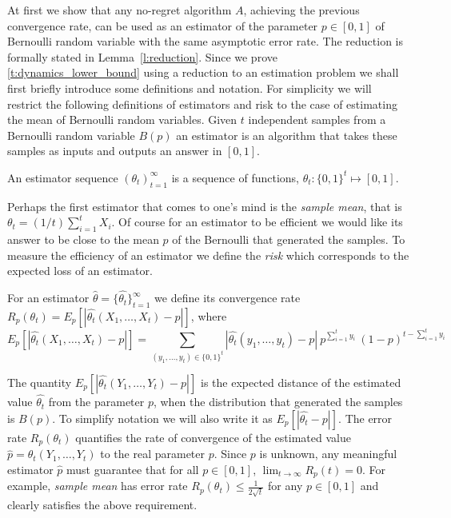 At first we show that any no-regret algorithm $A$, achieving the previous
convergence rate, can be used as an estimator of the parameter
$p \in [0,1] $ of Bernoulli random variable with the same asymptotic error
rate. The reduction is formally stated in Lemma~\ref{l:reduction}.
Since we prove \ref{t:dynamics_lower_bound} using a reduction to
an estimation problem we shall first briefly introduce some definitions and
notation. For simplicity we will restrict the following definitions
of estimators and risk to the case of estimating the mean of Bernoulli
random variables.
Given $t$ independent samples from a Bernoulli random variable $B(p)$
an estimator is an algorithm that takes these samples as inputs and
outputs an answer in $[0,1]$.
\begin{definition}\label{d:estimator}
  An estimator sequence $(\theta_t)_{t=1}^{\infty}$
  is a sequence of functions, $\theta_t: \{0,1\}^t\mapsto [0,1]$.
\end{definition}
Perhaps the first estimator that comes to one's mind is the
\emph{sample mean}, that is $\theta_t=(1/t) \sum_{i=1}^t X_i$.
Of course for an estimator to be efficient we would like its answer to be
close to the mean $p$ of the Bernoulli that generated the samples.
To measure the efficiency of an estimator we define the \emph{risk}
which corresponds to the expected loss of an estimator.
\begin{definition}\label{d:risk}
  For an estimator $\hat{\theta} =\{\hat{\theta_t}\}_{t=1}^\infty$ we define
  its convergence rate
  $R_p(\theta_t) = E_p[|\hat{\theta_t}(X_1,\ldots,X_t) - p|]$,
  where
  \[
    E_p[|\hat{\theta_t}(X_1,\ldots,X_t) - p|]
    = \sum_{(y_1,\ldots,y_t)\in\{0,1\}^t}
    |\hat{\theta_t}(y_1,\ldots,y_t) -p|\
    p^{\sum_{i=1}^t y_i}\ (1-p)^{t-\sum_{i=1}^t y_i}
  \]
\end{definition}
The quantity $E_p[|\hat{\theta_t}(Y_1,\ldots,Y_t) - p|]$ is the expected distance
of the estimated value $\hat{\theta_t}$ from the parameter $p$, when the
distribution that generated the samples is $B(p)$.
To simplify notation we will also write it as $E_p[|\hat{\theta_t} - p|]$.
The error rate $R_p(\theta_t)$ quantifies the rate of
convergence of the estimated value $\hat{p} =\theta_t(Y_1,\ldots,Y_t)$ to the
real parameter $p$.  Since $p$ is unknown, any meaningful estimator $\hat{p}$
must guarantee that for all $p \in [0,1]$, $\lim_{t \to \infty} R_p(t)=0$.
For example, \emph{sample mean} has error rate
$R_p(\theta_t) \leq \frac{1}{2\sqrt{t}}$ for any $p \in [0,1]$ and clearly satisfies
the above requirement.

